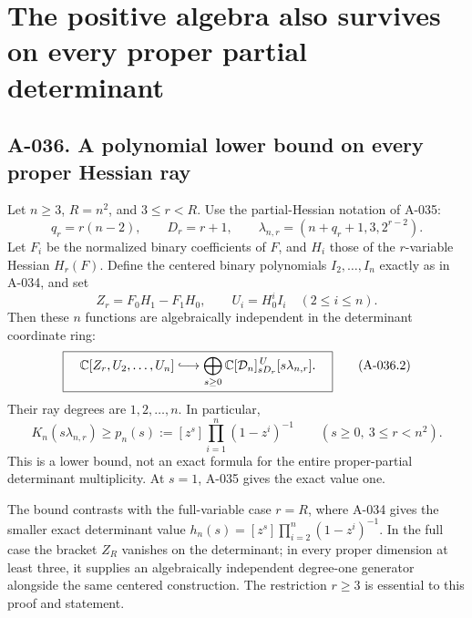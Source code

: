 \section{The positive algebra also survives on every proper partial determinant}

\subsection*{A-036. A polynomial lower bound on every proper Hessian ray}
Let \(n\geq3\), \(R=n^2\), and \(3\leq r<R\).
Use the partial-Hessian notation of A-035:
\[
 q_r=r(n-2),\qquad D_r=r+1,\qquad
 \lambda_{n,r}=(n+q_r+1,3,2^{r-2}).
\]
Let \(F_i\) be the normalized binary coefficients of \(F\),
and \(H_i\) those of the \(r\)-variable Hessian
\(H_r(F)\). Define the centered binary polynomials
\(I_2,\ldots,I_n\) exactly as in A-034, and set
\[
 Z_r=F_0H_1-F_1H_0,\qquad U_i=H_0^i I_i
                                     \quad(2\leq i\leq n).
                                                               \tag{A-036.1}
\]
Then these \(n\) functions are algebraically independent
in the determinant coordinate ring:
\[
 \boxed{\quad
 \mathbb C[Z_r,U_2,\ldots,U_n]
       \lhook\joinrel\longrightarrow
 \bigoplus_{s\geq0}
      \mathbb C[\mathcal D_n]_{sD_r}^{\,U}[s\lambda_{n,r}].
 \quad}                                                        \tag{A-036.2}
\]
Their ray degrees are \(1,2,\ldots,n\). In particular,
\[
 \boxed{\quad
 K_n(s\lambda_{n,r})
       \geq p_n(s):=[z^s]\prod_{i=1}^n(1-z^i)^{-1}
       \qquad(s\geq0,\ 3\leq r<n^2).
 \quad}                                                        \tag{A-036.3}
\]
This is a lower bound, not an exact formula for the
entire proper-partial determinant multiplicity.
At \(s=1\), A-035 gives the exact value one.

The bound contrasts with the full-variable case \(r=R\),
where A-034 gives the smaller exact determinant value
\(h_n(s)=[z^s]\prod_{i=2}^n(1-z^i)^{-1}\).
In the full case the bracket \(Z_R\) vanishes on the
determinant; in every proper dimension at least three,
it supplies an algebraically independent degree-one
generator alongside the same centered construction.
The restriction \(r\geq3\) is essential to this proof
and statement.

